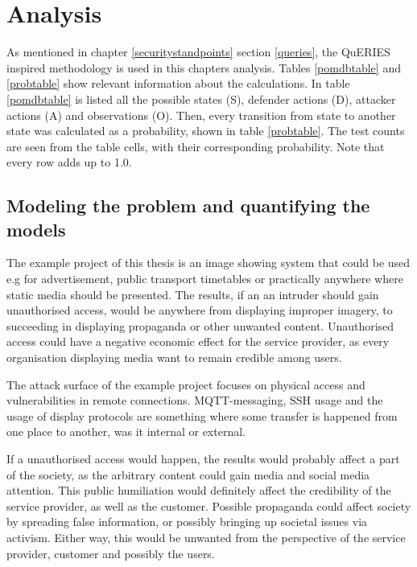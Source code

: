 \chapter{Analysis} \label{analysis}

As mentioned in chapter \ref{securitystandpoints} section \ref{queries}, the QuERIES inspired methodology is used in this chapters analysis. Tables \ref{pomdbtable} and \ref{probtable} show relevant information about the calculations. In table \ref{pomdbtable} is listed all the possible states (S), defender actions (D), attacker actions (A) and observations (O). Then, every transition from state to another state was calculated as a probability, shown in table \ref{probtable}. The test counts are seen from the table cells, with their corresponding probability. Note that every row adds up to 1.0.

\section{Modeling the problem and quantifying the models} \label{modprob}

The example project of this thesis is an image showing system that could be used e.g for advertisement, public transport timetables or practically anywhere where static media should be presented. The results, if an an intruder should gain unauthorised access, would be anywhere from displaying improper imagery, to succeeding in displaying propaganda or other unwanted content. Unauthorised access could have a negative economic effect for the service provider, as every organisation displaying media want to remain credible among users.

The attack surface of the example project focuses on physical access and vulnerabilities in remote connections. MQTT-messaging, SSH usage and the usage of display protocols are something where some transfer is happened from one place to another, was it internal or external.

If a unauthorised access would happen, the results would probably affect a part of the society, as the arbitrary content could gain media and social media attention. This public humiliation would definitely affect the credibility of the service provider, as well as the customer. Possible propaganda could affect society by spreading false information, or possibly bringing up societal issues via activism. Either way, this would be unwanted from the perspective of the service provider, customer and possibly the users.

